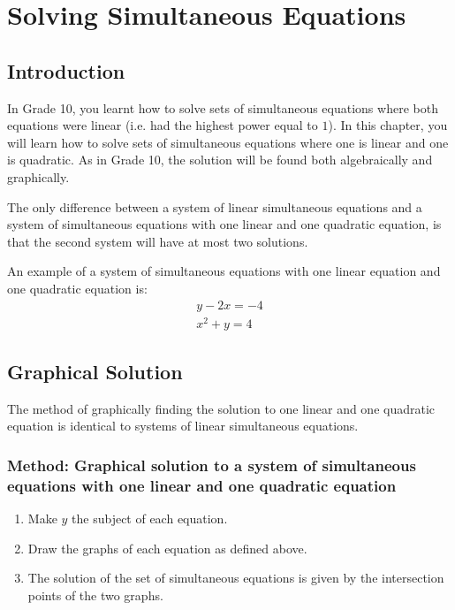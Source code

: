 \chapter{Solving Simultaneous Equations}
\label{m:se:sim11}


\section{Introduction}
In Grade 10, you learnt how to solve sets of simultaneous equations where both equations were linear (i.e. had the highest power equal to $1$). In this chapter, you will learn how to solve sets of simultaneous equations where one is linear and one is quadratic. As in Grade 10, the solution will be found both algebraically and graphically.

The only difference between a system of linear simultaneous equations and a system of simultaneous equations with one linear and one quadratic equation, is that the second system will have at most two solutions.

An example of a system of simultaneous equations with one linear equation and one quadratic equation is:
\begin{eqnarray}
\label{sim11:example}
y-2x=-4\\
x^2+y=4 \nonumber
\end{eqnarray}


\section{Graphical Solution}
The method of graphically finding the solution to one linear and one quadratic equation is identical to systems of linear simultaneous equations.

\subsection{Method: Graphical solution to a system of simultaneous equations with one linear and one quadratic equation}

\begin{enumerate}
\item{Make $y$ the subject of each equation.}
\item{Draw the graphs of each equation as defined above.}
\item{The solution of the set of simultaneous equations is given by the intersection points of the two graphs.}
\end{enumerate}


